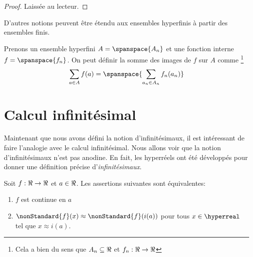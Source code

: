 \documentclass[a4paper, 12pt]{report}
\begin{document}
\begin{proof}
	Laissée au lecteur.
\end{proof}

D'autres notions peuvent être étendu aux ensembles hyperfinis à partir des
ensembles finis.

Prenons un ensemble hyperfini $A = \spanspace{A_{n}}$ et une fonction interne
$f = \spanspace{f_{n}}$. On peut définir la somme des images de $f$ sur $A$
comme
\footnote{Cela a bien du sens que $A_{n} \subseteq \real$ et
$f_{n} : \real \rightarrow \real$}
\begin{equation}
	\sum_{a \in A} f(a) = \spanspace{\sum_{a_{n} \in A_{n}} f_{n}(a_{n})}
\end{equation}





\section{Calcul infinitésimal}

Maintenant que nous avons défini la notion d'infinitésimaux, il est intéressant
de faire l'analogie avec le calcul infinitésimal. Nous allons voir que la notion
d'infinitésimaux n'est pas anodine. En fait, les hyperréels ont été développés
pour donner une définition précise d'\textit{infinitésimaux}.

\begin{proposition}
	Soit $f : \real \rightarrow \real$ et $a \in \real$. Les assertions
	suivantes sont équivalentes:
	\begin{enumerate}
		\item $f$ est continue en $a$
		\item $\nonStandard{f}(x) \approx \nonStandard{f}(i(a))$ pour tous $x
			\in \hyperreal$ tel que $x \approx i(a)$.
	\end{enumerate}
\end{proposition}
\end{document}
